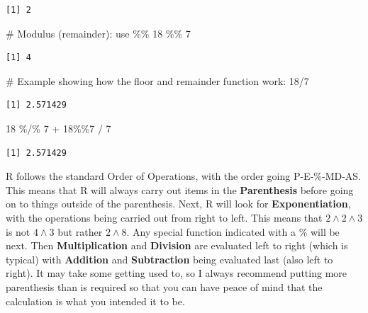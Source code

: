 \documentclass[
  letterpaper,
  DIV=11,
  numbers=noendperiod]{scrreprt}
\newenvironment{Shaded}{\begin{snugshade}}{\end{snugshade}}
\newcommand{\CommentTok}[1]{\textcolor[rgb]{0.37,0.37,0.37}{#1}}
\newcommand{\DecValTok}[1]{\textcolor[rgb]{0.68,0.00,0.00}{#1}}
\newcommand{\SpecialCharTok}[1]{\textcolor[rgb]{0.37,0.37,0.37}{#1}}
\begin{document}
\begin{verbatim}
[1] 2
\end{verbatim}

\begin{Shaded}
\begin{Highlighting}[]
\CommentTok{\# Modulus (remainder): use \%\%}
\DecValTok{18} \SpecialCharTok{\%\%} \DecValTok{7}
\end{Highlighting}
\end{Shaded}

\begin{verbatim}
[1] 4
\end{verbatim}

\begin{Shaded}
\begin{Highlighting}[]
\CommentTok{\# Example showing how the floor and remainder function work:}
\DecValTok{18}\SpecialCharTok{/}\DecValTok{7}
\end{Highlighting}
\end{Shaded}

\begin{verbatim}
[1] 2.571429
\end{verbatim}

\begin{Shaded}
\begin{Highlighting}[]
\DecValTok{18} \SpecialCharTok{\%/\%} \DecValTok{7} \SpecialCharTok{+} \DecValTok{18}\SpecialCharTok{\%\%}\DecValTok{7} \SpecialCharTok{/} \DecValTok{7}
\end{Highlighting}
\end{Shaded}

\begin{verbatim}
[1] 2.571429
\end{verbatim}

R follows the standard Order of Operations, with the order going
P-E-\%-MD-AS. This means that R will always carry out items in the
\textbf{Parenthesis} before going on to things outside of the
parenthesis. Next, R will look for \textbf{Exponentiation}, with the
operations being carried out from right to left. This means that
\(2 \wedge 2 \wedge 3\) is not \(4 \wedge 3\) but rather \(2\wedge8\).
Any special function indicated with a \% will be next. Then
\textbf{Multiplication} and \textbf{Division} are evaluated left to
right (which is typical) with \textbf{Addition} and \textbf{Subtraction}
being evaluated last (also left to right). It may take some getting used
to, so I always recommend putting more parenthesis than is required so
that you can have peace of mind that the calculation is what you
intended it to be.
\end{document}
